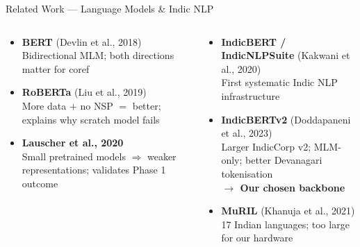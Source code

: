 \documentclass[aspectratio=169]{beamer}
\begin{document}
\begin{frame}{Related Work — Language Models \& Indic NLP}
  \begin{columns}[T]
      \begin{tcolorbox}[nbox={Transformer Language Models}]
        \small
        \begin{itemize}\setlength\itemsep{5pt}
          \item \textbf{BERT} (Devlin et al., 2018)\\
                Bidirectional MLM; both directions matter for coref
          \item \textbf{RoBERTa} (Liu et al., 2019)\\
                More data $+$ no NSP $=$ better; explains why scratch model fails
          \item \textbf{Lauscher et al., 2020}\\
                Small pretrained models $\Rightarrow$ weaker representations; validates Phase 1 outcome
        \end{itemize}
      \end{tcolorbox}

      \begin{tcolorbox}[nbox={Indic Language Models}]
        \small
        \begin{itemize}\setlength\itemsep{5pt}
          \item \textbf{IndicBERT / IndicNLPSuite}
                (Kakwani et al., 2020)\\
                First systematic Indic NLP infrastructure
          \item \textbf{IndicBERTv2} (Doddapaneni et al., 2023)\\
                Larger IndicCorp v2; MLM-only; better Devanagari tokenisation\\
                \textcolor{accentgreen}{\textbf{$\rightarrow$ Our chosen backbone}}
          \item \textbf{MuRIL} (Khanuja et al., 2021)\\
                17 Indian languages; too large for our hardware
        \end{itemize}
      \end{tcolorbox}
  \end{columns}
\end{frame}
\end{document}
